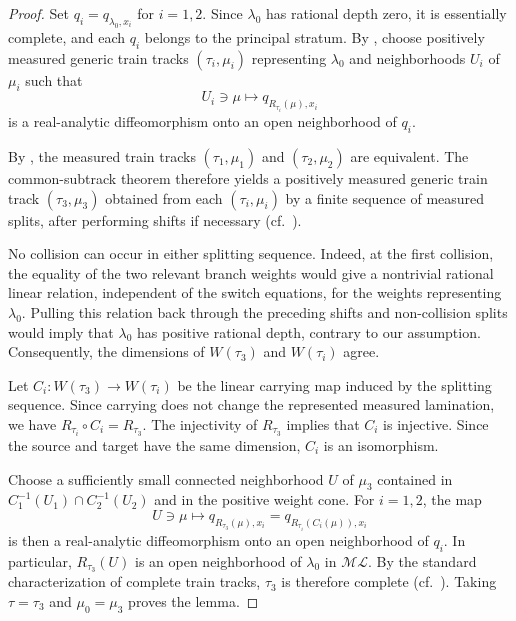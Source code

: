 \documentclass[dvipdfmx]{amsart}
\theoremstyle{remark}
\newcommand{\ml}{\mathcal{ML}}
\begin{document}
\begin{proof}
Set $q_i=q_{\lambda_0,x_i}$ for $i=1,2$.
Since $\lambda_0$ has rational depth zero, it is
essentially complete, and each $q_i$ belongs to
the principal stratum.
By , choose positively
measured generic train tracks $(\tau_i,\mu_i)$
representing $\lambda_0$ and neighborhoods $U_i$
of $\mu_i$ such that
\[
U_i\ni\mu\longmapsto q_{R_{\tau_i}(\mu),x_i}
\]
is a real-analytic diffeomorphism onto an open neighborhood of $q_i$.

By \cite[Theorem 2.8.5]{PennerHarer1992}, the measured train tracks $(\tau_1,\mu_1)$ and $(\tau_2,\mu_2)$ are equivalent. The common-subtrack theorem therefore yields a positively measured generic train track $(\tau_3,\mu_3)$ obtained from each $(\tau_i,\mu_i)$ by a finite sequence of measured splits, after performing shifts if necessary (cf.\ \cite[Theorem 2.3.1]{PennerHarer1992}).

No collision can occur in either splitting sequence. Indeed, at the first collision, the equality of the two relevant branch weights would give a nontrivial rational linear relation, independent of the switch equations, for the weights representing $\lambda_0$. Pulling this relation back through the preceding shifts and non-collision splits would imply that $\lambda_0$ has positive rational depth, contrary to our assumption. Consequently, the dimensions of $W(\tau_3)$ and $W(\tau_i)$ agree.

Let $C_i\colon W(\tau_3)\to W(\tau_i)$ be the linear carrying map induced by the splitting sequence. Since carrying does not change the represented measured lamination, we have $R_{\tau_i}\circ C_i=R_{\tau_3}$. The injectivity of $R_{\tau_3}$ implies that $C_i$ is injective. Since the source and target have the same dimension, $C_i$ is an isomorphism.

Choose a sufficiently small connected neighborhood $U$ of $\mu_3$ contained in $C_1^{-1}(U_1)\cap C_2^{-1}(U_2)$ and in the positive weight cone. For $i=1,2$, the map
\[
U\ni\mu\longmapsto q_{R_{\tau_3}(\mu),x_i}
=q_{R_{\tau_i}(C_i(\mu)),x_i}
\]
is then a real-analytic diffeomorphism onto an open neighborhood of $q_i$. In particular, $R_{\tau_3}(U)$ is an open neighborhood of $\lambda_0$ in $\ml$. By the standard characterization of complete train tracks, $\tau_3$ is therefore complete (cf.\ \cite[Propositions 1.4.9 and 1.7.6]{PennerHarer1992}). Taking $\tau=\tau_3$ and $\mu_0=\mu_3$ proves the lemma.
\end{proof}
\end{document}
